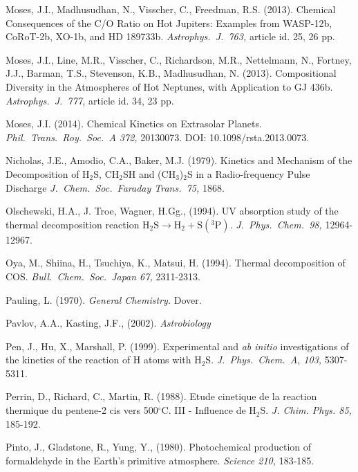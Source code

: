 \documentclass[preprint]{aastex}
\newcounter{reaction}
\begin{document}
\begin{thebibliography}{00}
Moses, J.I., Madhusudhan, N., Visscher, C., Freedman, R.S. (2013).
Chemical Consequences of the C/O Ratio on Hot Jupiters: Examples from WASP-12b, CoRoT-2b, XO-1b, and HD 189733b.
{\em Astrophys.\ J.\ 763,} article id. 25, 26 pp.

Moses, J.I., Line, M.R., Visscher, C., Richardson, M.R., Nettelmann, N., Fortney, J.J., Barman, T.S., Stevenson, K.B., Madhusudhan, N. (2013).
Compositional Diversity in the Atmospheres of Hot Neptunes, with Application to GJ 436b.
{\em Astrophys.\ J.\ 777,} article id. 34, 23 pp.

 Moses, J.I. (2014).
 Chemical Kinetics on Extrasolar Planets. 
 {\em Phil.\ Trans.\ Roy.\ Soc.\ A 372,} 20130073. DOI: 10.1098/rsta.2013.0073.
 
 Nicholas, J.E., Amodio, C.A., Baker, M.J. (1979).
Kinetics and Mechanism of the Decomposition of H$_2$S, CH$_2$SH and (CH$_3$)$_2$S in a Radio-frequency Pulse Discharge
{\em J.\ Chem.\ Soc.\ Faraday Trans.\ 75,} 1868.
 
Olschewski, H.A., J. Troe, Wagner, H.Gg., (1994).
UV absorption study of the thermal decomposition reaction $\mathrm{H}_2\mathrm{S} \rightarrow \mathrm{H}_2 + \mathrm{S}(^3\mathrm{P})$.
{\em J.\ Phys.\ Chem.\ 98,} 12964-12967.
 
Oya, M., Shiina, H., Tsuchiya, K., Matsui, H. (1994).
Thermal decomposition of COS.
{\em Bull.\ Chem.\ Soc.\ Japan 67,} 2311-2313.

Pauling, L. (1970).
{\em General Chemistry.} Dover.

Pavlov, A.A., Kasting, J.F., (2002).
{\em Astrobiology}

Pen, J., Hu, X., Marshall, P. (1999). 
Experimental and {\it ab initio} investigations of the kinetics of the reaction of H atoms with H$_2$S.
{\em J.\ Phys.\ Chem.\ A, 103,} 5307-5311.

Perrin, D., Richard, C., Martin, R. (1988). Etude cinetique de la reaction thermique du pentene-2 cis vers 500$^{\circ}$C. III - Influence de H$_2$S. {\em  J. Chim. Phys. 85,} 185-192.

Pinto, J., Gladstone, R., Yung, Y., (1980).
Photochemical production of formaldehyde in the Earth's primitive atmosphere. 
{\em Science 210,} 183-185.


\end{thebibliography}
\end{document}
